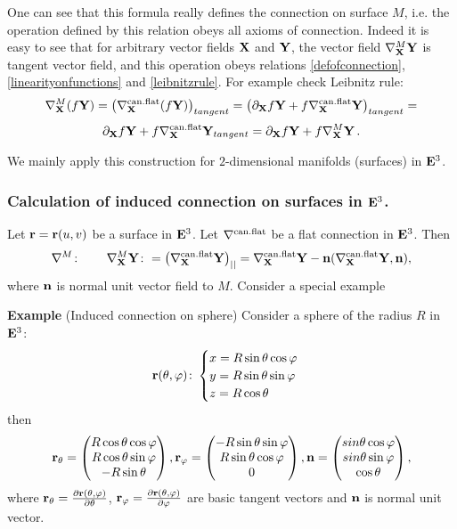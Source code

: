 \documentclass[12pt]{article}
\theoremstyle{theorem}
\numberwithin{equation}{section}
\begin{document}
One can see that this formula really defines the connection on surface
  $M$, i.e. the operation defined by this relation obeys all 
axioms of connection.  Indeed it is easy to see that
for arbitrary vector fields ${\bf X}$ and ${\bf Y}$, the vector field
$\nabla^M_{\bf X} {\bf Y}$ is tangent vector field,
and this operation obeys relations
\eqref{defofconnection}, 
\eqref{linearityonfunctions}
and \eqref{leibnitzrule}. For example check Leibnitz rule:
             $$
  \nabla^M_{\bf X}(f{\bf Y})=\left(\nabla^{\rm can.flat}_{\bf X}(f{\bf Y})\right)_{tangent}=
  \left(\partial_{\bf X} f{\bf Y}+f\nabla^{\rm can.flat}_{\bf X}{\bf Y}\right)_{tangent}=
            $$
            \begin{equation*}
     \partial_{\bf X} f{\bf Y}+f\nabla^{\rm can.flat}_{\bf X}{\bf Y}_{tangent}=
     \partial_{\bf X} f{\bf Y}+f\nabla^M_{\bf X}{\bf Y}\,.
             \end{equation*}


    We mainly apply this construction for $2$-dimensional manifolds
(surfaces) in ${\bf E}^3$.


\subsubsection {Calculation of induced connection on surfaces in ${\bf E}^3$.}

Let ${\bf r}={\bf r}(u,v)$ be a surface in ${\bf E}^3$. Let $\nabla^{\rm can.flat}$ be a flat connection in ${\bf E}^3$.
   Then
\begin{equation}\label{inducedconnection1}
\nabla^{M}\colon\qquad \nabla^{M}_{\bf X}{\bf Y} \colon =\left(\nabla^{\rm can.flat}_{\bf X}{\bf Y}\right)_{||}=
\nabla^{\rm can.flat}_{\bf X}{\bf Y}-
{\bf n}(\nabla^{\rm can.flat}_{\bf X}{\bf Y},{\bf n}),
\end{equation}
where ${\bf n}$ is normal unit vector field to $M$. Consider a special example

  {\bf Example} (Induced connection on sphere)
   Consider a sphere of the radius $R$ in ${\bf E}^3$:
              $$
           {\bf r}(\theta,\varphi)\colon \begin{cases}
           x=R\sin\theta \cos\varphi\cr
           y=R\sin\theta \sin\varphi\cr
           z=R\cos\theta\cr
           \end{cases}
              $$
then
           $$
      {\bf r}_{\theta}=\begin{pmatrix}
            R\cos\theta\cos\varphi\cr
            R\cos\theta\sin\varphi\cr
            -R\sin\theta\cr
                  \end{pmatrix},
       {\bf r}_{\varphi}=\begin{pmatrix}
            -R\sin\theta\sin\varphi\cr
            R\sin\theta\cos\varphi\cr
            0\cr
                  \end{pmatrix},
                  {\bf n}=\begin{pmatrix}
            sin\theta\cos\varphi\cr
            sin\theta\sin\varphi\cr
            \cos\theta\cr
                  \end{pmatrix},
           $$
where ${\bf r}_\theta={\partial {\bf r}(\theta,\varphi)\over \partial \theta}$,
${\bf r}_\varphi={\partial {\bf r}(\theta,\varphi)\over \partial \varphi}$ are basic tangent vectors and ${\bf n}$ is normal unit vector.
\end{document}
